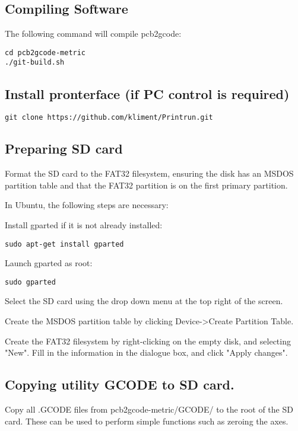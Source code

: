 \documentclass[a4paper,11pt]{article}  %
\begin{document}
\subsection{Compiling Software}
The following command will compile pcb2gcode:
\begin{lstlisting}
cd pcb2gcode-metric
./git-build.sh
\end{lstlisting}

\subsection{Install pronterface (if PC control is required)}
\begin{lstlisting}
git clone https://github.com/kliment/Printrun.git
\end{lstlisting}


\subsection{Preparing SD card}
Format the SD card to the FAT32 filesystem, ensuring the disk has an
MSDOS partition table and that the FAT32 partition is on the first
primary partition.

In Ubuntu, the following steps are necessary:

Install gparted if it is not already installed:

\begin{lstlisting}
sudo apt-get install gparted
\end{lstlisting}

Launch gparted as root:
\begin{lstlisting}
sudo gparted
\end{lstlisting}

Select the SD card using the drop down menu at the top right of the
screen.

Create the MSDOS partition table by clicking Device-\textgreater Create Partition Table.

Create the FAT32 filesystem by right-clicking on the empty disk, and selecting "New". 
Fill in the information in the dialogue box, and click "Apply changes". 

\subsection{Copying utility GCODE to SD card.}
Copy all .GCODE files from pcb2gcode-metric/GCODE/ to the root of the SD card.
These can be used to perform simple functions such as zeroing the axes.
\end{document}
